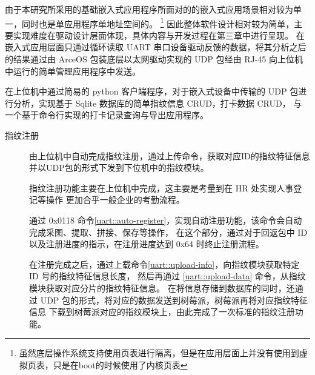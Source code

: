     由于本研究所采用的基础嵌入式应用程序所面对的的嵌入式应用场景相对较为单一，同时也是单应用程序单地址空间的。
    \footnote{虽然底层操作系统支持使用页表进行隔离，但是在应用层面上并没有使用到虚拟页表，只是在boot的时候使用了内核页表}
    因此整体软件设计相对较为简单，主要实现难度在驱动设计层面体现，具体内容与开发过程在第三章中进行呈现。
    在嵌入式应用层面只通过循环读取 UART 串口设备驱动反馈的数据，将其分析之后的结果通过由 ArceOS 包装底层以太网驱动实现的
    UDP 包经由 RJ-45 向上位机中运行的简单管理应用程序中发送。

    在上位机中通过简易的 python 客户端程序，对于嵌入式设备中传输的 UDP 包进行分析，实现基于 Sqlite 数据库的简单指纹信息 CRUD，打卡数据 CRUD，
    与一个基于命令行实现的打卡记录查询与导出应用程序。

    \begin{description}
        \item[指纹注册] 由上位机中自动完成指纹注册，通过上传命令，获取对应ID的指纹特征信息并以UDP包的形式下发到下位机中的指纹模块。
        
        指纹注册功能主要在上位机中完成，这主要是考量到在 HR 处实现人事登记等操作
        更加合乎一般企业的考勤流程。
        
        通过 0x0118 命令\ref{uart::auto-register}，实现自动注册功能，该命令会自动完成采图、提取、拼接、保存等操作，
        在这个部分，通过对于回返包中 ID 以及注册进度的指示，在注册进度达到 0x64 时终止注册流程。

        \begin{table}[htbp]
            \caption{自动注册命令用户层帧} \label{uart::auto-register}
        \end{table}

        在注册完成之后，通过上载命令\ref{uart::upload-info}，向指纹模块获取特定 ID 号的指纹特征信息长度，
        然后再通过 \ref{uart::upload-data} 命令，从指纹模块获取对应分片的指纹特征信息。
        在将信息存储到数据库的同时，还通过 UDP 包的形式，将对应的数据发送到树莓派，树莓派再将对应指纹特征信息
        下载到树莓派对应的指纹模块上，由此完成了一次标准的指纹注册功能。


\end{description}

